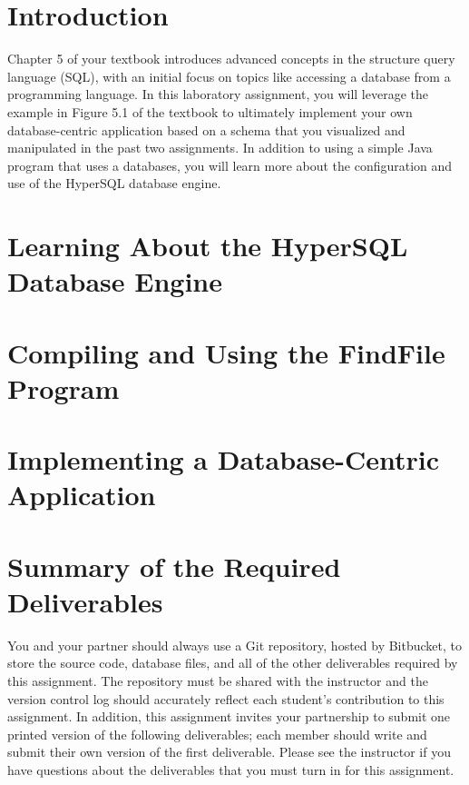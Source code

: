 


\usepackage[compact]{titlesec}



\section*{Introduction}

Chapter 5 of your textbook introduces advanced concepts in the structure query language (SQL), with an initial focus on
topics like accessing a database from a programming language. In this laboratory assignment, you will leverage the
example in Figure 5.1 of the textbook to ultimately implement your own database-centric application based on a schema
that you visualized and manipulated in the past two assignments. In addition to using a simple Java program that uses a
databases, you will learn more about the configuration and use of the HyperSQL database engine.

\vspace*{-.05in}
\section*{Learning About the HyperSQL Database Engine}


\vspace*{-.05in}
\section*{Compiling and Using the FindFile Program}



\vspace*{-.05in}
\section*{Implementing a Database-Centric Application}


\section*{Summary of the Required Deliverables}

You and your partner should always use a Git repository, hosted by Bitbucket, to store the source
code, database files, and all of the other deliverables required by this assignment. The repository must be shared with
the instructor and the version control log should accurately reflect each student's contribution to this assignment. In
addition, this assignment invites your partnership to submit one printed version of the following deliverables; each
member should write and submit their own version of the first deliverable. Please see the instructor if you have
questions about the deliverables that you must turn in for this assignment.


